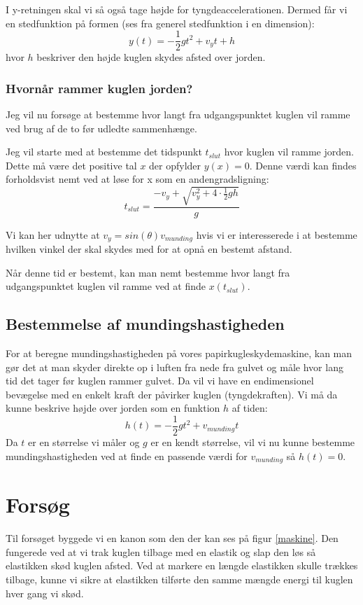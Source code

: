 \documentclass[12pt,a4paper]{article}
\theoremstyle{break}
\theoremstyle{nonumberplain}
\begin{document}
I y-retningen skal vi så også tage højde for tyngdeaccelerationen.
Dermed får vi en stedfunktion på formen (ses fra generel stedfunktion i en dimension): $$y(t)=-\frac{1}{2}gt^2+v_yt+h$$
hvor $h$ beskriver den højde kuglen skydes afsted over jorden.

\subsubsection{Hvornår rammer kuglen jorden?}
Jeg vil nu forsøge at bestemme hvor langt fra udgangspunktet kuglen vil ramme ved brug af de to før udledte sammenhænge.

Jeg vil starte med at bestemme det tidspunkt $t_{slut}$ hvor kuglen vil ramme jorden.
Dette må være det positive tal $x$ der opfylder $y(x)=0$. 
Denne værdi kan findes forholdsvist nemt ved at løse for x som en andengradsligning:
$$t_{slut} = \dfrac{-v_y + \sqrt{v_y^2 + 4 \cdot \frac{1}{2}gh}}{g}$$

Vi kan her udnytte at $v_y = sin(\theta )v_{munding}$ hvis vi er interesserede i at bestemme hvilken vinkel der skal skydes med for at opnå en bestemt afstand.

Når denne tid er bestemt, kan man nemt bestemme hvor langt fra udgangspunktet kuglen vil ramme ved at finde $x(t_{slut})$.

\subsection{Bestemmelse af mundingshastigheden}
For at beregne mundingshastigheden på vores papirkugleskydemaskine, kan man gør det at man skyder direkte op i luften fra nede fra gulvet og måle hvor lang tid det tager før kuglen rammer gulvet.
Da vil vi have en endimensionel bevægelse med en enkelt kraft der påvirker kuglen (tyngdekraften). 
Vi må da kunne beskrive højde over jorden som en funktion $h$ af tiden:
$$h(t)=-\frac{1}{2}gt^2 + v_{munding}t$$
Da $t$ er en størrelse vi måler og $g$ er en kendt størrelse, vil vi nu kunne bestemme mundingshastigheden ved at finde en passende værdi for $v_{munding}$ så $h(t)=0$.

\section{Forsøg}
Til forsøget byggede vi en kanon som den der kan ses på figur \ref{maskine}. 
Den fungerede ved at vi trak kuglen tilbage med en elastik og slap den løs så elastikken skød kuglen afsted. 
Ved at markere en længde elastikken skulle trækkes tilbage, kunne vi sikre at elastikken tilførte den samme mængde energi til kuglen hver gang vi skød. 
\end{document}
